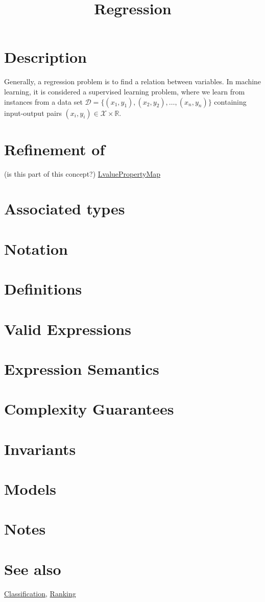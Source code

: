 \documentclass{article}
\begin{document}
\title{Regression}
\maketitle

\section*{Description}

Generally, a regression problem is to find a relation between variables. 
In machine learning, it is considered a supervised learning problem, where we 
learn from instances from a data set 
$\mathcal{D}=\{ (x_1,y_1), (x_2,y_2), \ldots, (x_n, y_n ) \}$ 
containing input-output pairs $(x_i,y_i)\in \mathcal{X}\times \mathbb{R}$. 

\begin{figure}
\end{figure}


\section*{Refinement of}

(is this part of this concept?)
\href{http://www.boost.org/libs/property_map/LvaluePropertyMap.html}{LvaluePropertyMap}

\section*{Associated types}
\section*{Notation}
\section*{Definitions}
\section*{Valid Expressions}
\section*{Expression Semantics}
\section*{Complexity Guarantees}
\section*{Invariants}
\section*{Models}
\section*{Notes}
\section*{See also}

\href{\kmlroot/classification.html}{Classification},
\href{\kmlroot/ranking.html}{Ranking}



\end{document}
